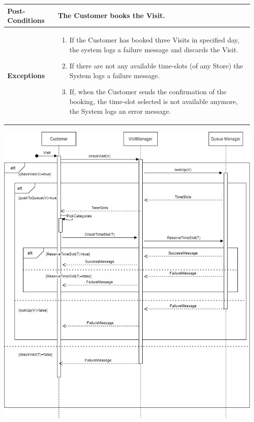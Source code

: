 \documentclass[a4paper, 12pt, oneside]{article}
\begin{document}
\begin{tabularx}{\linewidth}{| l | X |}
	\hline
	\textbf{Post-Conditions} & The Customer books the Visit.\\
	
	\hline
	\textbf{Exceptions} & \parbox{0.7\textwidth}{ \begin{enumerate}
			\item If the Customer has booked three Visits in specified day, the system logs a failure message and discards the Visit.
			\item If there are not any available time-slots (of any Store) the System logs a failure message.
			\item If, when the Customer sends the confirmation of the booking, the time-slot selected is not available anymore, the System logs an error message.
		\end{enumerate}}\\

	\hline
	
\end{tabularx}

\begin{minipage}{\linewidth}
            \centering
           \includegraphics[height=0.5\textheight, scale=1, keepaspectratio]{img/seq_diag/GetVisitD.jpg}
\end{minipage}
\end{document}
